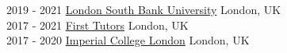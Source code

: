\documentclass[print]{cv-style}          %
\begin{document}
\begin{entrylist}
\entry
  {2019 - 2021}
  {\href{https://www.lsbu.ac.uk/}{London South Bank University}}
  {London, UK}
  {
  \\
  }
\vspace{-0.3cm} %
\entry
  {2017 - 2021}
  {\href{https://www.firsttutors.com/uk/}{First Tutors}}
  {London, UK}
  {
  \\
  }
\vspace{-0.3cm} %
\entry
  {2017 - 2020}
  {\href{https://www.imperial.ac.uk/}{Imperial College London}}
  {London, UK}
  {
  \\
  }
\end{entrylist}
\vspace{-0.4cm}
\end{document}
